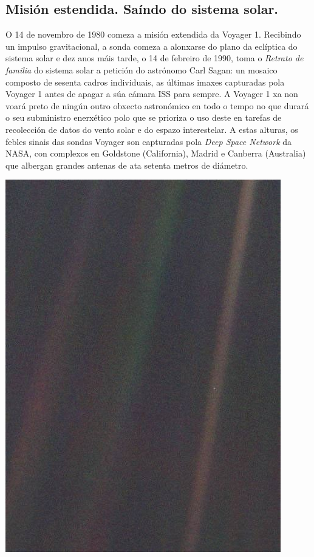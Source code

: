 \begin{refsection}
\begin{multicols}{2}
\subsection*{Misión estendida. Saíndo do sistema solar.}



O 14 de novembro de 1980 comeza a misión extendida da Voyager 1. Recibindo un
impulso gravitacional, a sonda comeza a alonxarse do plano da eclíptica do
sistema solar e dez anos máis tarde, o 14 de febreiro de 1990, toma o
\textit{Retrato de familia} do sistema solar a petición do astrónomo Carl
Sagan: un mosaico composto de sesenta cadros individuais, as últimas imaxes
capturadas pola Voyager 1 antes de apagar a súa cámara ISS para sempre. A
Voyager 1 xa non voará preto de ningún outro obxecto astronómico en todo o
tempo no que durará o seu subministro enerxético polo que se prioriza o uso
deste en tarefas de recolección de datos do vento solar e do espazo
interestelar. A estas alturas, os febles sinais das sondas Voyager son
capturadas pola \textit{Deep Space Network} da NASA, con complexos en Goldstone
(California), Madrid e Canberra (Australia) que albergan grandes antenas de ata
setenta metros de diámetro.

\begin{center}
    \includegraphics[width=0.6\linewidth]{revistas/002/imaxes/PaleBlueDot.jpg}
\end{center}


\end{multicols}
\end{refsection}
